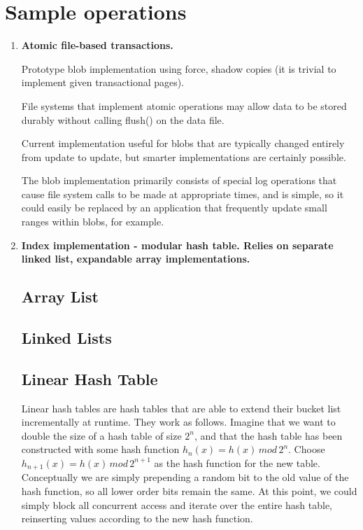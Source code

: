 \documentclass[letterpaper,twocolumn,english]{article}
\begin{document}
\section{Sample operations}

\begin{enumerate}

  \item {\bf Atomic file-based transactions. 
    
    Prototype blob implementation  using force, shadow copies (it is trivial to implement given transactional
  pages).  

  File systems that implement atomic operations may allow
  data to be stored durably without calling flush() on the data
  file. 

  Current implementation useful for blobs that are typically
  changed entirely from update to update, but smarter implementations
  are certainly possible. 

  The blob implementation primarily consists
  of special log operations that cause file system calls to be made at
  appropriate times, and is simple, so it could easily be replaced by
  an application that frequently update small ranges within blobs, for
  example.}

  \item {\bf Index implementation - modular hash table. Relies on separate
  linked list, expandable array implementations.}

\subsection{Array List}
\subsection{Linked Lists}

\subsection{Linear Hash Table\label{sub:Linear-Hash-Table}}

Linear hash tables are hash tables that are able to extend their bucket
list incrementally at runtime. They work as follows. Imagine that
we want to double the size of a hash table of size $2^{n}$, and that
the hash table has been constructed with some hash function $h_{n}(x)=h(x)\, mod\,2^{n}$.
Choose $h_{n+1}(x)=h(x)\, mod\,2^{n+1}$ as the hash function for
the new table. Conceptually we are simply prepending a random bit
to the old value of the hash function, so all lower order bits remain
the same. At this point, we could simply block all concurrent access
and iterate over the entire hash table, reinserting values according
to the new hash function. 


\end{enumerate}
\end{document}
